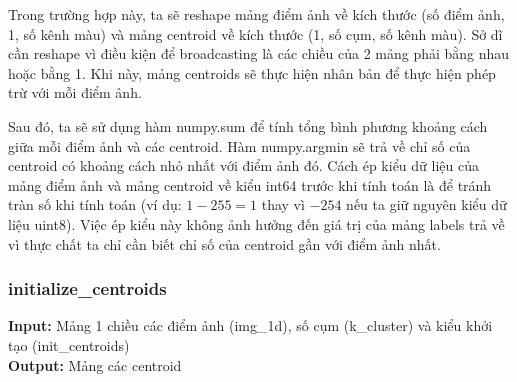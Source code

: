 \documentclass{article}
\begin{document}
Trong trường hợp này, ta sẽ reshape mảng điểm ảnh về kích thước (số điểm ảnh, 1, số kênh màu) và mảng centroid về kích thước (1, số cụm, số kênh màu). Sở dĩ cần reshape vì điều kiện để broadcasting là các chiều của 2 mảng phải bằng nhau hoặc bằng 1. Khi này, mảng centroids sẽ thực hiện nhân bản để thực hiện phép trừ với mỗi điểm ảnh.

Sau đó, ta sẽ sử dụng hàm numpy.sum để tính tổng bình phương khoảng cách giữa mỗi điểm ảnh và các centroid. Hàm numpy.argmin sẽ trả về chỉ số của centroid có khoảng cách nhỏ nhất với điểm ảnh đó. Cách ép kiểu dữ liệu của mảng điểm ảnh và mảng centroid về kiểu int64 trước khi tính toán là để tránh tràn số khi tính toán (ví dụ: $1 - 255 = 1$ thay vì $-254$ nếu ta giữ nguyên kiểu dữ liệu uint8). Việc ép kiểu này không ảnh hưởng đến giá trị của mảng labels trả về vì thực chất ta chỉ cần biết chỉ số của centroid gần với điểm ảnh nhất.

\subsubsection{initialize\_centroids}
\textbf{Input:} Mảng 1 chiều các điểm ảnh (img\_1d), số cụm (k\_cluster) và kiểu khởi tạo (init\_centroids) \\
\textbf{Output:} Mảng các centroid
\end{document}

